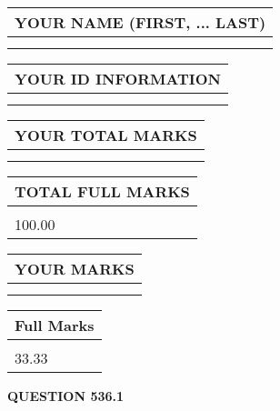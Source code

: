 \documentclass{ctexart}
\begin{document}
   
   
   
\newpage 
\setcounter{page}{ 
   536001 } 
   
   
   
   
\noindent\begin{tabular}{|l|}
\hline
YOUR NAME (FIRST, ... LAST)  \\
\hline
 \\ 
 \\ 
\hline
\end{tabular}
\hspace{0.05in} \begin{tabular}{|l|}
\hline
 YOUR   ID   INFORMATION  \\
\hline
 \\ 
 \\ 
\hline
\end{tabular}
   
   
\vspace{0.2in}\noindent\begin{tabular}{|l|}
\hline
YOUR TOTAL MARKS  \\
\hline
 \\ 
 \\ 
\hline
\end{tabular}
\hspace{0.05in} \begin{tabular}{|l|}
\hline
TOTAL FULL MARKS  \\
\hline
 \\ 
100.00 \\
\hline
\end{tabular}
   
   
 \vspace{0.2in}
 
 
 
 
   
   
  
\vspace{0.2in}
  
\noindent\begin{tabular}{|l|}
\hline
 YOUR MARKS  \\
\hline
 \\ 
 \\ 
\hline
\end{tabular}
\hspace{0.05in} \begin{tabular}{|l|}
\hline
 Full Marks  \\
\hline
 \\ 
33.33 \\
\hline
\end{tabular}
{\textbf{\Large{QUESTION
536.1 
}}}
  
\end{document}
